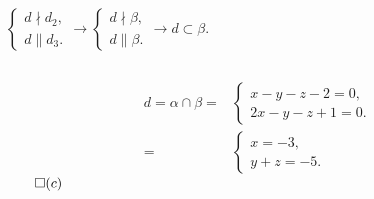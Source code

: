 \documentclass[10pt]{beamer}
\begin{document}
{\begin{columns}[c]
		 \centering 
		 $\begin{cases}
		   d \nmid d_2, \\
		   d \parallel d_3.
		  \end{cases} 
		  \rightarrow
		  \begin{cases}
		   d \nmid \beta,\\
		   d \parallel \beta.
		  \end{cases}
		  \rightarrow 
		  d \subset \beta$.	 
		\end{columns} \bigskip
		\begin{align*}
		d=\alpha \cap \beta =& \begin{cases}
		                        x-y-z-2=0, \\
		                        2x-y-z+1=0.
		                       \end{cases} \\
			            =& \begin{cases}
		                        x=-3, \\
		                        y+z=-5.
		                       \end{cases}
		\end{align*} \hfill $\qed(c)$
    }  
  
\end{document}
